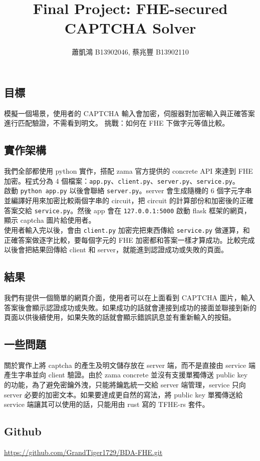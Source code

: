 \documentclass[12pt,a4paper]{article}
\title{Final Project: FHE-secured CAPTCHA Solver}
\author{蕭凱鴻 B13902046, 蔡兆豐 B13902110}
\date{}
\begin{document}
\maketitle

\subsection{目標}

模擬一個場景，使用者的 CAPTCHA 輸入會加密，伺服器對加密輸入與正確答案進行匹配驗證，不需看到明文。
挑戰：如何在 FHE 下做字元等值比較。

\subsection{實作架構}

我們全部都使用 python 實作，搭配 zama 官方提供的 concrete API 來達到 FHE 加密。程式分為 4 個檔案：\verb|app.py|、\verb|client.py|、\verb|server.py|、\verb|service.py|。\\

啟動 \verb|python app.py| 以後會聯絡 \verb|server.py|。server 會生成隨機的 6 個字元字串並編譯好用來加密比較兩個字串的 circuit，把 circuit 的計算部份和加密後的正確答案交給 \verb|service.py|。然後 app 會在 \verb|127.0.0.1:5000| 啟動 flask 框架的網頁，顯示 captcha 圖片給使用者。\\

使用者輸入完以後，會由 \verb|client.py| 加密完把東西傳給 \verb|service.py| 做運算，和正確答案做逐字比較，要每個字元的 FHE 加密都和答案一樣才算成功。比較完成以後會把結果回傳給 client 和 server，就能進到認證成功或失敗的頁面。

\subsection{結果}

我們有提供一個簡單的網頁介面，使用者可以在上面看到 CAPTCHA 圖片，輸入答案後會顯示認證成功或失敗。如果成功的話就會連接到成功的接面並聯接到新的頁面以供後續使用，如果失敗的話就會顯示錯誤訊息並有重新輸入的按鈕。

\subsection{一些問題}

關於實作上將 captcha 的產生及明文儲存放在 server 端，而不是直接由 service 端產生字串並向 client 驗證。由於 zama concrete 並沒有支援單獨傳送 public key 的功能，為了避免密鑰外洩，只能將鑰匙統一交給 server 端管理，service 只向 server 必要的加密文本。如果要達成更自然的寫法，將 public key 單獨傳送給 service 端讓其可以使用的話，只能用由 rust 寫的 TFHE-rs 套件。

\subsection{Github}

\url{https://github.com/GrandTiger1729/BDA-FHE.git}
\end{document}
